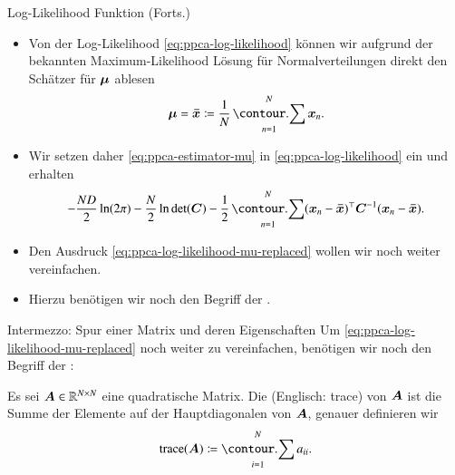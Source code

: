 \begin{frame}{Log-Likelihood Funktion (Forts.)}{}
	\begin{itemize}
		\item Von der Log-Likelihood \eqref{eq:ppca-log-likelihood} können wir aufgrund der bekannten
			Maximum-Likelihood Lösung für Normalverteilungen direkt den Schätzer für $\bm{\mu}$ ablesen
		\begin{equation} \label{eq:ppca-estimator-mu}
			\bmu = \bxmean \coloneqq \frac{1}{N} \sum_{n=1}^N \bx_n.
		\end{equation}
		\item Wir setzen daher \eqref{eq:ppca-estimator-mu} in \eqref{eq:ppca-log-likelihood} ein und erhalten
		\begin{equation} \label{eq:ppca-log-likelihood-mu-replaced}
			-\frac{ND}{2} \ln(2 \pi) - \frac{N}{2} \ln \det(\bC) - \frac{1}{2} \sum_{n=1}^N (\bx_n - \bxmean)^\top \bC^{-1} (\bx_n - \bxmean).
		\end{equation}
		\item Den Ausdruck \eqref{eq:ppca-log-likelihood-mu-replaced} wollen wir noch weiter vereinfachen.
		\item Hierzu benötigen wir noch den Begriff der .
	\end{itemize}
\end{frame}


\begin{frame}{Intermezzo: Spur einer Matrix und deren Eigenschaften}{}
	Um \eqref{eq:ppca-log-likelihood-mu-replaced} noch weiter zu vereinfachen, benötigen wir noch den Begriff der :
	\begin{mydef}
		Es sei $\bm{A} \in \mathbb{R}^{N \times N}$ eine quadratische Matrix. Die  (Englisch: trace) von $\bm{A}$ ist die
		Summe der Elemente auf der Hauptdiagonalen von $\bm{A}$, genauer definieren wir
		\begin{equation*}
			\trace(\bA) \coloneqq \sum_{i=1}^N a_{ii}.
		\end{equation*}
	\end{mydef}
\end{frame}



